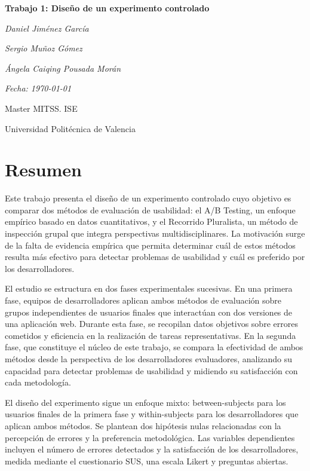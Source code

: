 \documentclass[a4paper,12pt]{report}
\begin{document}
\begin{titlepage}
    \centering
    \vspace*{3cm}
    {\Huge\bfseries Trabajo 1: Diseño de un experimento controlado \par}
    \vspace{2cm}
    {\Large\itshape Daniel Jiménez García \par}
    {\Large\itshape Sergio Muñoz Gómez \par}
    {\Large\itshape Ángela Caiqing Pousada Morán \par}
    \vspace{1cm}
    {\Large\itshape Fecha: \today \par}
    \vfill
    {\large Master MITSS. ISE \par}
    {\large Universidad Politécnica de Valencia\par}
\end{titlepage}


\chapter*{Resumen}
Este trabajo presenta el diseño de un experimento controlado cuyo objetivo es comparar dos métodos de evaluación de usabilidad: el A/B Testing, un enfoque empírico basado en datos cuantitativos, y el Recorrido Pluralista, un método de inspección grupal que integra perspectivas multidisciplinares. La motivación surge de la falta de evidencia empírica que permita determinar cuál de estos métodos resulta más efectivo para detectar problemas de usabilidad y cuál es preferido por los desarrolladores.

El estudio se estructura en dos fases experimentales sucesivas. En una primera fase, equipos de desarrolladores aplican ambos métodos de evaluación sobre grupos independientes de usuarios finales que interactúan con dos versiones de una aplicación web. Durante esta fase, se recopilan datos objetivos sobre errores cometidos y eficiencia en la realización de tareas representativas. En la segunda fase, que constituye el núcleo de este trabajo, se compara la efectividad de ambos métodos desde la perspectiva de los desarrolladores evaluadores, analizando su capacidad para detectar problemas de usabilidad y midiendo su satisfacción con cada metodología.

El diseño del experimento sigue un enfoque mixto: between-subjects para los usuarios finales de la primera fase y within-subjects para los desarrolladores que aplican ambos métodos. Se plantean dos hipótesis nulas relacionadas con la percepción de errores y la preferencia metodológica. Las variables dependientes incluyen el número de errores detectados y la satisfacción de los desarrolladores, medida mediante el cuestionario SUS, una escala Likert y preguntas abiertas.
\end{document}
